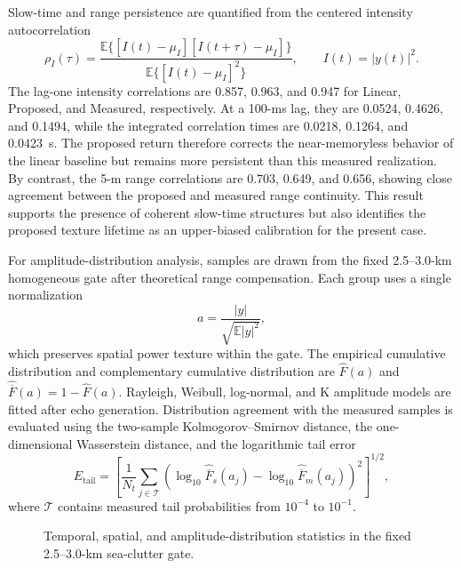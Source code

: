 Slow-time and range persistence are quantified from the centered intensity autocorrelation
\begin{equation}
\rho_I(\tau)=\frac{\mathbb{E}\{[I(t)-\mu_I][I(t+\tau)-\mu_I]\}}{\mathbb{E}\{[I(t)-\mu_I]^2\}},\qquad I(t)=|y(t)|^2.
\label{eq:intensity_autocorrelation}
\end{equation}
The lag-one intensity correlations are 0.857, 0.963, and 0.947 for Linear, Proposed, and Measured, respectively. At a 100-ms lag, they are 0.0524, 0.4626, and 0.1494, while the integrated correlation times are 0.0218, 0.1264, and 0.0423~s. The proposed return therefore corrects the near-memoryless behavior of the linear baseline but remains more persistent than this measured realization. By contrast, the 5-m range correlations are 0.703, 0.649, and 0.656, showing close agreement between the proposed and measured range continuity. This result supports the presence of coherent slow-time structures but also identifies the proposed texture lifetime as an upper-biased calibration for the present case.

For amplitude-distribution analysis, samples are drawn from the fixed 2.5--3.0-km homogeneous gate after theoretical range compensation. Each group uses a single normalization
\begin{equation}
a=\frac{|y|}{\sqrt{\mathbb{E}|y|^2}},
\label{eq:rms_normalized_echo_amplitude}
\end{equation}
which preserves spatial power texture within the gate. The empirical cumulative distribution and complementary cumulative distribution are $\widehat{F}(a)$ and $\widehat{\overline{F}}(a)=1-\widehat{F}(a)$. Rayleigh, Weibull, log-normal, and K amplitude models are fitted after echo generation. Distribution agreement with the measured samples is evaluated using the two-sample Kolmogorov--Smirnov distance, the one-dimensional Wasserstein distance, and the logarithmic tail error
\begin{equation}
E_{\mathrm{tail}}=\left[\frac{1}{N_t}\sum_{j\in\mathcal{T}}\left(\log_{10}\widehat{\overline{F}}_{s}(a_j)-\log_{10}\widehat{\overline{F}}_{m}(a_j)\right)^2\right]^{1/2},
\label{eq:log_ccdf_tail_error}
\end{equation}
where $\mathcal{T}$ contains measured tail probabilities from $10^{-4}$ to $10^{-1}$.

\begin{figure}[!t]
\centering
{}
\caption{Temporal, spatial, and amplitude-distribution statistics in the fixed 2.5--3.0-km sea-clutter gate.}
\label{fig:full_scene_echo_statistics}
\end{figure}


